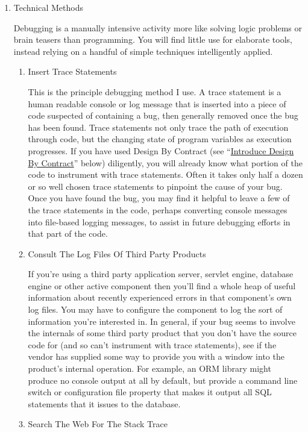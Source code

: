 \documentclass{article}
\begin{document}
\begin{enumerate}
\item Technical Methods
\label{sec:orgheadline322}

Debugging is a manually intensive activity more like solving logic
problems or brain teasers than programming. You will find little use for
elaborate tools, instead relying on a handful of simple techniques
intelligently applied.

\begin{enumerate}
\item Insert Trace Statements
\label{sec:orgheadline308}

This is the principle debugging method I use. A trace statement is a
human readable console or log message that is inserted into a piece of
code suspected of containing a bug, then generally removed once the bug
has been found. Trace statements not only trace the path of execution
through code, but the changing state of program variables as execution
progresses. If you have used Design By Contract (see “\hyperref[sec:orgheadline307]{Introduce
Design By Contract}” below) diligently, you will already know what
portion of the code to instrument with trace statements. Often it takes
only half a dozen or so well chosen trace statements to pinpoint the
cause of your bug. Once you have found the bug, you may find it helpful
to leave a few of the trace statements in the code, perhaps converting
console messages into file-based logging messages, to assist in future
debugging efforts in that part of the code.

\item Consult The Log Files Of Third Party Products
\label{sec:orgheadline309}

If you're using a third party application server, servlet engine,
database engine or other active component then you'll find a whole heap
of useful information about recently experienced errors in that
component's own log files. You may have to configure the component to
log the sort of information you're interested in. In general, if your
bug seems to involve the internals of some third party product that you
don't have the source code for (and so can't instrument with trace
statements), see if the vendor has supplied some way to provide you with
a window into the product's internal operation. For example, an ORM
library might produce no console output at all by default, but provide a
command line switch or configuration file property that makes it output
all SQL statements that it issues to the database.

\item Search The Web For The Stack Trace
\label{sec:orgheadline310}


\end{enumerate}
\end{enumerate}
\end{document}
